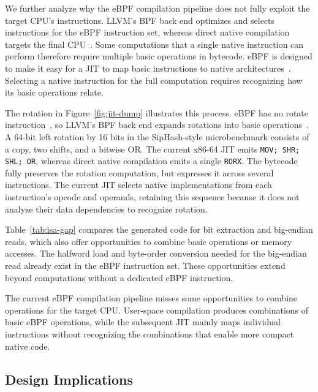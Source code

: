 We further analyze why the eBPF compilation pipeline does not fully exploit the target CPU's instructions. LLVM's BPF back end optimizes and selects instructions for the eBPF instruction set, whereas direct native compilation targets the final CPU~\cite{llvmndcodegenerator}. Some computations that a single native instruction can perform therefore require multiple basic operations in bytecode. eBPF is designed to make it easy for a JIT to map basic instructions to native architectures~\cite{linuxndclassicbpf}. Selecting a native instruction for the full computation requires recognizing how its basic operations relate.

The rotation in Figure~\ref{fig:jit-dump} illustrates this process. eBPF has no rotate instruction~\cite{rfc9669}, so LLVM's BPF back end expands rotations into basic operations~\cite{llvmndbpflowering}. A 64-bit left rotation by 16 bits in the SipHash-style microbenchmark consists of a copy, two shifts, and a bitwise OR. The current x86-64 JIT emits \texttt{MOV; SHR; SHL; OR}, whereas direct native compilation emits a single \texttt{RORX}. The bytecode fully preserves the rotation computation, but expresses it across several instructions. The current JIT selects native implementations from each instruction's opcode and operands, retaining this sequence because it does not analyze their data dependencies to recognize rotation.



Table~\ref{tab:isa-gap} compares the generated code for bit extraction and big-endian reads, which also offer opportunities to combine basic operations or memory accesses. The halfword load and byte-order conversion needed for the big-endian read already exist in the eBPF instruction set. These opportunities extend beyond computations without a dedicated eBPF instruction.



\begin{finding}[unbreakable]
\finlabel The current eBPF compilation pipeline misses some opportunities to combine operations for the target CPU. User-space compilation produces combinations of basic eBPF operations, while the subsequent JIT mainly maps individual instructions without recognizing the combinations that enable more compact native code.
\end{finding}

\subsection{Design Implications}
\label{subsec:char-challenges}

